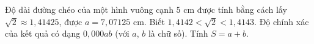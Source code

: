 \begin{ex}
Độ dài đường chéo của một hình vuông cạnh $5$ cm được tính bằng cách lấy $\sqrt2\approx1{,}41425$, được $a=7{,}07125$ cm. Biết $1{,}4142<\sqrt2<1{,}4143$. Độ chính xác của kết quả có dạng $0{,}000ab$ (với $a$, $b$ là chữ số). Tính $S=a+b$.
\end{ex}
